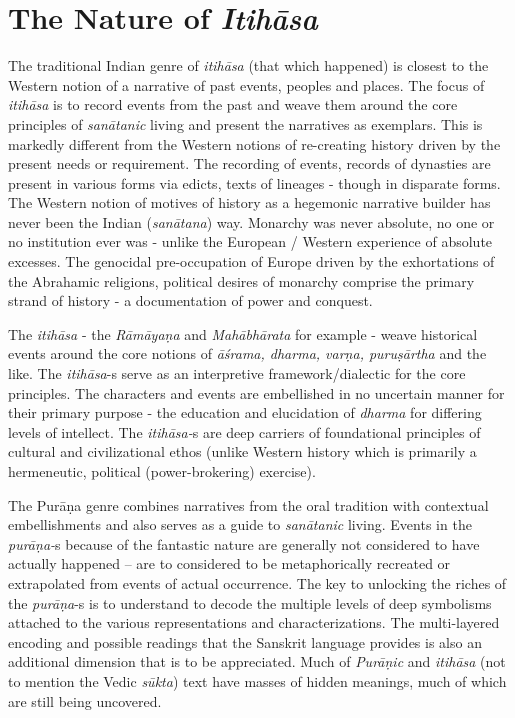 \section*{The Nature of \textit{Itihāsa}}

The traditional Indian genre of \textit{itihāsa} (that which happened) is closest to the Western notion of a narrative of past events, peoples and places. The focus of \textit{itihāsa} is to record events from the past and weave them around the core principles of \textit{sanātanic} living and present the narratives as exemplars. This is markedly different from the Western notions of re-creating history driven by the present needs or requirement. The recording of events, records of dynasties are present in various forms via edicts, texts of lineages - though in disparate forms. The Western notion of motives of history as a hegemonic narrative builder has never been the Indian (\textit{sanātana}) way. Monarchy was never absolute, no one or no institution ever was - unlike the European / Western experience of absolute excesses. The genocidal pre-occupation of Europe driven by the exhortations of the Abrahamic religions, political desires of monarchy comprise the primary strand of history - a documentation of power and conquest.

The \textit{itihāsa} - the \textit{Rāmāyaṇa} and \textit{Mahābhārata} for example - weave historical events around the core notions of \textit{āśrama, dharma, varṇa, puruṣārtha} and the like. The \textit{itihāsa}-s serve as an interpretive framework/dialectic for the core principles. The characters and events are embellished in no uncertain manner for their primary purpose - the education and elucidation of \textit{dharma} for differing levels of intellect. The \textit{itihāsa-}s are deep carriers of foundational principles of cultural and civilizational ethos (unlike Western history which is primarily a hermeneutic, political (power-brokering) exercise).

The Purāṇa genre combines narratives from the oral tradition with contextual embellishments and also serves as a guide to \textit{sanātanic} living. Events in the \textit{purāṇa-}s because of the fantastic nature are generally not considered to have actually happened – are to considered to be metaphorically recreated or extrapolated from events of actual occurrence. The key to unlocking the riches of the \textit{purāṇa}-s is to understand to decode the multiple levels of deep symbolisms attached to the various representations and characterizations. The multi-layered encoding and possible readings that the Sanskrit language provides is also an additional dimension that is to be appreciated. Much of \textit{Purāṇic} and \textit{itihāsa} (not to mention the Vedic \textit{sūkta}) text have masses of hidden meanings, much of which are still being uncovered.


